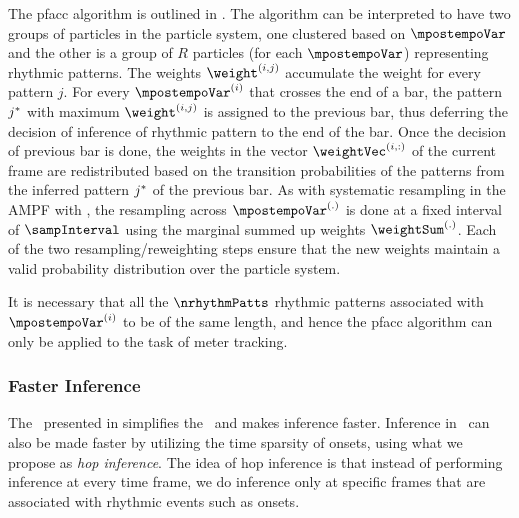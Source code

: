 The \acrshort{pfacc} algorithm is outlined in . The algorithm can be interpreted to have two groups of particles in the particle system, one clustered based on $\mpostempoVar$ and the other is a group of $R$ particles (for each $\mpostempoVar$) representing rhythmic patterns. The weights $\weight^{(i,j)}$ accumulate the weight for every pattern $j$. For every $\mpostempoVar^{(i)}$ that crosses the end of a bar, the pattern $j^{\ast}$ with maximum $\weight^{(i,j)}$ is assigned to the previous bar, thus deferring the decision of inference of rhythmic pattern to the end of the bar. Once the decision of previous bar is done, the weights in the vector $\weightVec^{(i,:)}$ of the current frame are redistributed based on the transition probabilities of the patterns from the inferred pattern $j^{\ast}$ of the previous bar. As with systematic resampling in the \gls{AMPF} with \bpmodel, the resampling across $\mpostempoVar^{(.)}$ is done at a fixed interval of $\sampInterval$ using the marginal summed up weights $\weightSum^{(.)}$. Each of the two resampling/reweighting steps ensure that the new weights maintain a valid probability distribution over the particle system. 

It is necessary that all the $\nrhythmPatts$ rhythmic patterns associated with $\mpostempoVar^{(i)}$ to be of the same length, and hence the \acrshort{pfacc} algorithm can only be applied to the task of meter tracking. 
\subsubsection{Faster Inference}
The \momodel\ presented in  simplifies the \bpmodel\ and makes inference faster. Inference in \bpmodel\ can also be made faster by utilizing the time sparsity of onsets, using what we propose as \textit{hop inference}. The idea of hop inference is that instead of performing inference at every time frame, we do inference only at specific frames that are associated with rhythmic events such as onsets. 


